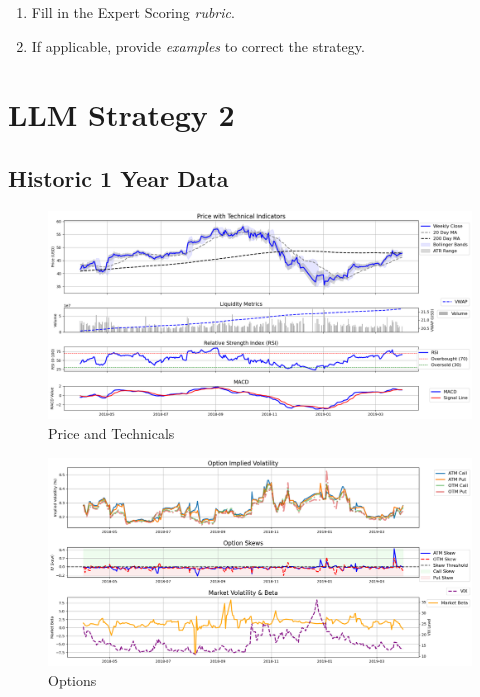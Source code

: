 \documentclass[8pt]{scrartcl}
\begin{document}
\begin{tcolorbox}[colback=blue!10, colframe=blue!60, title=\textbf{TASKS}, sharp corners=southwest]
\begin{enumerate}
    \item Fill in the Expert Scoring \textit{rubric}.
    \item If applicable, provide \textit{examples} to correct the strategy.
\end{enumerate}
\end{tcolorbox}

\newpage


\section*{LLM Strategy 2}
\label{app:s2}

\subsection*{Historic 1 Year Data}

\begin{figure}[H]
    \centering
    \includegraphics[width=1\linewidth]{judge_reviews/AAPL_M_gpt-4o-mini/2019-04-01/judge_Price_with_Technical_Indicators.png}
    \caption{Price and Technicals}
\end{figure}

\begin{figure}[H]
    \centering
    \includegraphics[width=1\linewidth]{judge_reviews/AAPL_M_gpt-4o-mini/2019-04-01/judge_Option_Implied_Volatility.png}
    \caption{Options}
\end{figure}
\end{document}
